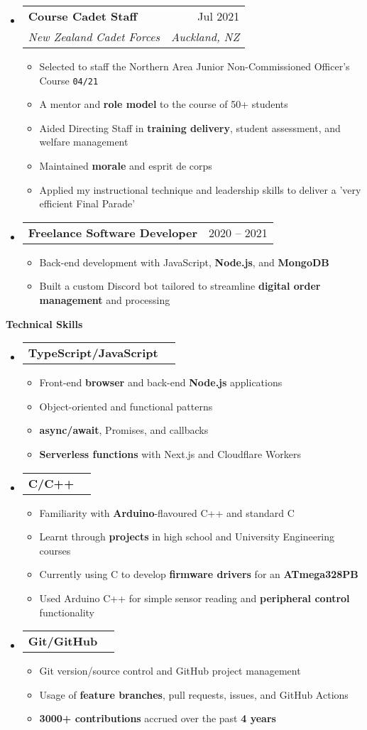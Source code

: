 \documentclass[11pt,a4paper]{article}[leftmargin=*]
\makeatletter
\def \entryspacing {-0pt}
\renewcommand{\section}[2]{\vspace{5pt}
  \colorbox{secondary}{\color{white}\raggedbottom\normalsize\textbf{{#1}{\hspace{2pt}#2}}}
}
\newcommand{\resumeEntryStart}{\begin{itemize}[leftmargin=2.5mm]}
\newcommand{\resumeEntryEnd}{\end{itemize}\vspace{\entryspacing}}
\newcommand{\resumeItemListStart}{\begin{itemize}[leftmargin=4.5mm]}
\newcommand{\resumeItemListEnd}{\end{itemize}}
\newcommand{\resumeItem}[1]{
  \item\small{
    {#1 \vspace{-2pt}}
  }
}
\newcommand{\resumeEntryTSDL}[4]{
  \vspace{-1pt}\item[]
    \begin{tabularx}{0.97\textwidth}{X@{\hspace{60pt}}r}
      \textbf{\color{primary}#1} & {\firabook\color{accent}\small#2} \\
      \textit{\color{accent}\small#3} & \textit{\color{accent}\small#4} \\
    \end{tabularx}\vspace{-6pt}
}
\newcommand{\resumeEntryTD}[2]{
  \vspace{-1pt}\item[]
    \begin{tabularx}{0.97\textwidth}{X@{\hspace{60pt}}r}
      \textbf{\color{primary}#1} & {\firabook\color{accent}\small#2} \\
    \end{tabularx}\vspace{-6pt}
}
\newcommand{\resumeBf}[1]{\small\textbf{\color{halfbold}#1}}
\makeatother
\begin{document}
\resumeEntryStart
\resumeEntryTSDL
{Course Cadet Staff}{Jul 2021}
{New Zealand Cadet Forces}{Auckland, NZ}

\pagebreak

\resumeItemListStart
\resumeItem {Selected to staff the Northern Area Junior Non-Commissioned Officer's Course \texttt{04/21}}
\resumeItem {A mentor and \resumeBf{role model} to the course of 50+ students}
\resumeItem {Aided Directing Staff in \resumeBf{training delivery}, student assessment, and welfare management}
\resumeItem {Maintained \resumeBf{morale} and esprit de corps}
\resumeItem {Applied my instructional technique and leadership skills to deliver a 'very efficient Final Parade'}
\resumeItemListEnd
\resumeEntryEnd

\resumeEntryStart
\resumeEntryTD
{Freelance Software Developer}{2020 -- 2021}
\resumeItemListStart
\resumeItem {Back-end development with JavaScript, \resumeBf{Node.js}, and \resumeBf{MongoDB}}
\resumeItem {Built a custom Discord bot tailored to streamline \resumeBf{digital order management} and processing}
\resumeItemListEnd
\resumeEntryEnd


\section{\faCogs}{Technical Skills}

\resumeEntryStart
\resumeEntryTD
{TypeScript/JavaScript}{}
\resumeItemListStart
\resumeItem {Front-end \resumeBf{browser} and back-end \resumeBf{Node.js} applications}
\resumeItem {Object-oriented and functional patterns}
\resumeItem {\resumeBf{async/await}, Promises, and callbacks}
\resumeItem {\resumeBf{Serverless functions} with Next.js and Cloudflare Workers}
\resumeItemListEnd
\resumeEntryEnd

\resumeEntryStart
\resumeEntryTD
{C/C++}{}
\resumeItemListStart
\resumeItem {Familiarity with \resumeBf{Arduino}-flavoured C++ and standard C}
\resumeItem {Learnt through \resumeBf{projects} in high school and University Engineering courses}
\resumeItem {Currently using C to develop \resumeBf{firmware drivers} for an \resumeBf{ATmega328PB}}
\resumeItem {Used Arduino C++ for simple sensor reading and \resumeBf{peripheral control} functionality}
\resumeItemListEnd
\resumeEntryEnd

\resumeEntryStart
\resumeEntryTD
{Git/GitHub}{}
\resumeItemListStart
\resumeItem {Git version/source control and GitHub project management}
\resumeItem {Usage of \resumeBf{feature branches}, pull requests, issues, and GitHub Actions}
\resumeItem {\resumeBf{3000+ contributions} accrued over the past \resumeBf{4 years}}
\resumeItemListEnd
\resumeEntryEnd
\end{document}
